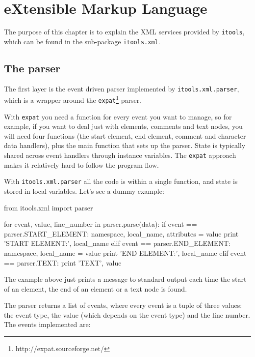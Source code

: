 \chapter{eXtensible Markup Language}

The purpose of this chapter is to explain the XML services provided by
{\tt itools}, which can be found in the sub-package {\tt itools.xml}.


\section{The parser}

The first layer is the event driven parser implemented by
{\tt itools.xml.parser}, which is a wrapper around the
{\tt expat}\footnote{http://expat.sourceforge.net/} parser.

With {\tt expat} you need a function for every event you want to manage,
so for example, if you want to deal just with elements, comments and text
nodes, you will need four functions (the start element, end element, comment
and character data handlers), plus the main function that sets up the
parser. State is typically shared across event handlers through instance
variables. The {\tt expat} approach makes it relatively hard to follow the
program flow.

With {\tt itools.xml.parser} all the code is within a single function, and
state is stored in local variables. Let's see a dummy example:

\begin{code}
    from itools.xml import parser

    for event, value, line_number in parser.parse(data):
        if event == parser.START_ELEMENT:
            namespace, local_name, attributes = value
            print 'START ELEMENT:', local_name
        elif event == parser.END_ELEMENT:
            namespace, local_name = value
            print 'END ELEMENT:', local_name
        elif event == parser.TEXT:
            print 'TEXT', value
\end{code}

The example above just prints a message to standard output each time the
start of an element, the end of an element or a text node is found.

The parser returns a list of events, where every event is a tuple of three
values: the event type, the value (which depends on the event type) and
the line number. The events implemented are:

